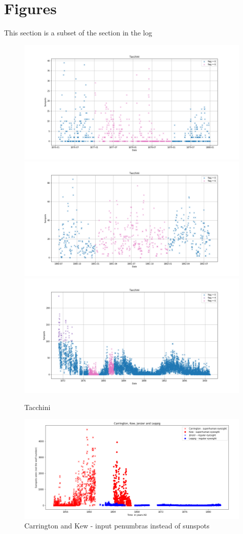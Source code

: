 \documentclass[12pt]{article}
\begin{document}
\section{Figures}
This section is a subset of the section in the log

\begin{figure}[H]
    \includegraphics[width=0.5\linewidth]{tacchini1877_patch.png}
    \includegraphics[width=0.5\linewidth]{tacchini1881_patch.png}
    \includegraphics[width=\linewidth]{tacchini_pached.png}
    \caption{Tacchini}
    \label{fig:tacchini}
\end{figure}

\begin{figure}[H]
  \includegraphics[width=\linewidth]{CarringtonHasGoodEyesight.png}
  \caption{Carrington and Kew - input penumbras instead of sunspots}
  \label{fig:carrington-kew-penumbras}
\end{figure}
\end{document}
